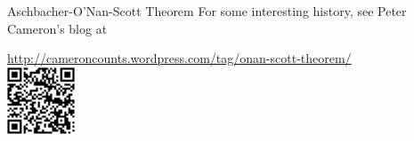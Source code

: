 \begin{frame}[fragile,label=OSTheoremHistory]{Aschbacher-O'Nan-Scott Theorem}
For some interesting history, see Peter Cameron's blog at 
\begin{center}
{\small  \url{http://cameroncounts.wordpress.com/tag/onan-scott-theorem/}}
\\[8pt]
          \includegraphics[height=2cm]{inputs/qrCameron}
        \end{center}

\end{frame}


